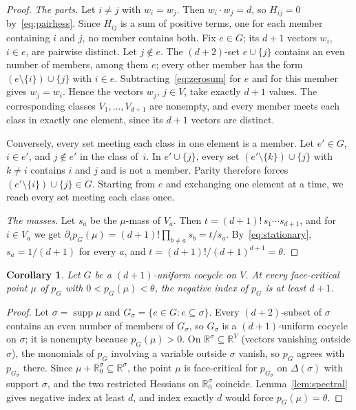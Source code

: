 \documentclass[11pt]{article}
\newtheorem{corollary}[theorem]{Corollary}
\theoremstyle{definition}
\numberwithin{equation}{section}
\newcommand{\R}{\mathbb R}
\DeclareMathOperator{\supp}{supp}
\begin{document}
\begin{proof}
\emph{The parts.} Let $i\ne j$ with $w_i=w_j$. Then $w_i\cdot w_j=d$, so $H_{ij}=0$ by~\eqref{eq:pairhess}. Since $H_{ij}$ is a sum of positive terms, one for each member containing $i$ and $j$, no member contains both. Fix $e\in G$; its $d+1$ vectors $w_i$, $i\in e$, are pairwise distinct. Let $j\notin e$. The $(d+2)$-set $e\cup\{j\}$ contains an even number of members, among them $e$; every other member has the form $(e\setminus\{i\})\cup\{j\}$ with $i\in e$. Subtracting~\eqref{eq:zerosum} for $e$ and for this member gives $w_j=w_i$. Hence the vectors $w_j$, $j\in V$, take exactly $d+1$ values. The corresponding classes $V_1,\ldots,V_{d+1}$ are nonempty, and every member meets each class in exactly one element, since its $d+1$ vectors are distinct.

Conversely, every set meeting each class in one element is a member. Let $e'\in G$, $i\in e'$, and $j\notin e'$ in the class of~$i$. In $e'\cup\{j\}$, every set $(e'\setminus\{k\})\cup\{j\}$ with $k\ne i$ contains $i$ and $j$ and is not a member. Parity therefore forces $(e'\setminus\{i\})\cup\{j\}\in G$. Starting from $e$ and exchanging one element at a time, we reach every set meeting each class once.

\emph{The masses.} Let $s_a$ be the $\mu$-mass of $V_a$. Then $t=(d+1)!\,s_1\cdots s_{d+1}$, and for $i\in V_a$ we get $\partial_ip_G(\mu)=(d+1)!\prod_{b\ne a}s_b=t/s_a$. By~\eqref{eq:stationary}, $s_a=1/(d+1)$ for every $a$, and $t=(d+1)!/(d+1)^{d+1}=\theta$.
\end{proof}

\begin{corollary}\label{cor:index}
Let $G$ be a $(d+1)$-uniform cocycle on $V$. At every face-critical point $\mu$ of $p_G$ with $0<p_G(\mu)<\theta$, the negative index of $p_G$ is at least $d+1$.
\end{corollary}
\begin{proof}
Let $\sigma=\supp\mu$ and $G_\sigma=\{e\in G:e\subseteq\sigma\}$. Every $(d+2)$-subset of $\sigma$ contains an even number of members of $G_\sigma$, so $G_\sigma$ is a $(d+1)$-uniform cocycle on $\sigma$; it is nonempty because $p_G(\mu)>0$. On $\R^\sigma\subseteq\R^V$ (vectors vanishing outside $\sigma$), the monomials of $p_G$ involving a variable outside $\sigma$ vanish, so $p_G$ agrees with $p_{G_\sigma}$ there. Since $\mu+\R^\sigma_0\subseteq\R^\sigma$, the point $\mu$ is face-critical for $p_{G_\sigma}$ on $\Delta(\sigma)$ with support $\sigma$, and the two restricted Hessians on $\R^\sigma_0$ coincide. Lemma~\ref{lem:spectral} gives negative index at least $d$, and index exactly $d$ would force $p_G(\mu)=\theta$.
\end{proof}
\end{document}
